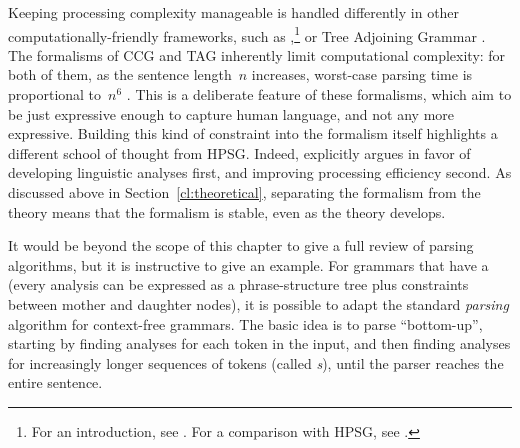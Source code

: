 \documentclass[output=paper
                ,modfonts
                ,nonflat
	        ,collection
	        ,collectionchapter
	        ,collectiontoclongg
 	        ,biblatex
                ,babelshorthands
                ,newtxmath
                ,draftmode
                ,colorlinks, citecolor=brown
]{./langsci/langscibook}
\begin{document}
Keeping processing complexity manageable is handled differently
in other computationally-friendly frameworks,
such as ,\footnote{%
	For an introduction, see \citet{steedman2011ccg}.
	For a comparison with HPSG, see .
}
or Tree Adjoining Grammar \citep[TAG;][]{Joshi87a-u,SAJ88a-u}.
The formalisms of CCG and TAG inherently limit computational complexity:
for both of them, as the sentence length~$n$ increases,
worst-case parsing time is proportional to~$n^6$ \citep{Kasamietal1989}.
This is a deliberate feature of these formalisms,
which aim to be just expressive enough to capture human language,
and not any more expressive.
Building this kind of constraint into the formalism itself
highlights a different school of thought from HPSG.
Indeed, \citet[64]{MuellerCoreGram} explicitly argues
in favor of developing linguistic analyses first,
and improving processing efficiency second.
As discussed above in Section~\ref{cl:theoretical},
separating the formalism from the theory
means that the formalism is stable, even as the theory develops.


It would be beyond the scope of this chapter
to give a full review of parsing algorithms,
but it is instructive to give an example.
For grammars that have a 
(every analysis can be expressed as a phrase-structure tree
plus constraints between mother and daughter nodes),
it is possible to adapt the standard \textit{parsing} algorithm \citep{kay:1973} for context-free grammars.
The basic idea is to parse ``bottom-up'',
starting by finding analyses for each token in the input,
and then finding analyses for increasingly longer sequences of tokens (called \textit{s}),
until the parser reaches the entire sentence.
\end{document}
